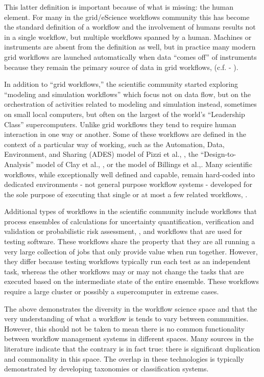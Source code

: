 This latter definition is important because of what is missing: the human
element. For many in the grid/eScience workflows community this has become
the standard definition of a workflow and the involvement of humans
results not in a single workflow, but multiple workflows spanned by a human.
Machines or instruments are absent from the definition as well, but in
practice many modern grid workflows are launched automatically
when data ``comes off'' of instruments because they remain the primary
source of data in grid workflows, (c.f. - \cite{megino_panda:_2015}).

In addition to ``grid workflows,'' the scientific community started
exploring ``modeling and simulation workflows'' which focus not on data
flow, but on the orchestration of activities related to modeling and
simulation instead, sometimes on small local computers, but often on the
largest of the world's ``Leadership Class'' supercomputers. Unlike grid
workflows they tend to require human interaction in one way or another.
Some of these workflows are defined in the context of a particular way
of working, such as the Automation, Data, Environment, and Sharing
(ADES) model of Pizzi et al., \cite{pizzi_aiida:_2016}, the
``Design-to-Analysis'' model of Clay et al., \cite{clay_incorporating_2015}, or
the model of Billings et al.,\cite{billings_eclipse_2017}. Many scientific workflows, while exceptionally well defined and capable, remain hard-coded into dedicated environments - 
not general purpose workflow systems - developed for the sole purpose of
executing that single or at most a few related workflows, \cite{lingerfelt_beam:_2016}.

Additional types of workflows in the scientific community include
workflows that process ensembles of calculations for uncertainty quantification, verification and validation or probabilistic risk assessment, \cite{montoya_apex_2016},
and workflows that are used for testing software. These workflows share the property that they are all running a very large collection of jobs that only provide value when run together. However, they differ because testing workflows typically run each test as an independent task, whereas the other workflows may or may not change the tasks that are executed based on the intermediate state of the entire ensemble. These workflows require a large cluster or possibly a supercomputer in extreme cases.

The above demonstrates the diversity in the workflow science space and that the very understanding of what a workflow is tends to vary between communities. However, this should not be taken to mean there is no common functionality between workflow management systems in different spaces. Many sources in the literature indicate that the contrary is in fact true: there is significant duplication and commonality in this space. The overlap in these technologies is typically demonstrated by developing taxonomies or classification systems.

